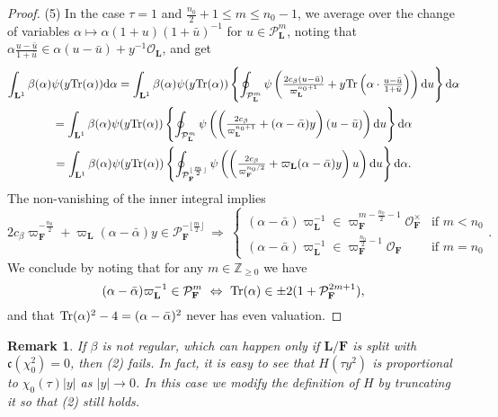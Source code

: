 \documentclass[A4]{amsart}
\def\leq{\leqslant}
\def\geq{\geqslant}
\newtheorem{remark} [theorem] {Remark}
\numberwithin{equation}{section} \everymath{\displaystyle}
\newcommand{\Tr}{{\rm Tr}}
\newcommand{\Z}{\mathbb{Z}}
\newcommand{\ud}{\mathrm{d}}
\newcommand{\F}{\mathbf{F}}
\newcommand{\bL}{\mathbf{L}}
\newcommand{\vO}{\mathcal{O}}
\newcommand{\vP}{\mathcal{P}}
\newcommand{\norm}[1][\cdot]{\lvert #1 \rvert}
\newcommand{\cond}{\mathfrak{c}}
\begin{document}
\begin{proof}
\noindent (5) In the case $\tau = 1$ and $\tfrac{n_0}{2}+1 \leq m \leq n_0-1$, we average over the change of variables $\alpha \mapsto \alpha (1+u)(1+\bar{u})^{-1}$ for $u \in \vP_{\bL}^m$, noting that $\alpha \tfrac{u-\bar{u}}{1+\bar{u}} \in \alpha(u-\bar{u})+y^{-1}\vO_{\bL}$, and get
\begin{multline*}
	\int_{\bL^1} \beta(\alpha) \psi(y \Tr(\alpha)) \ud \alpha = \int_{\bL^1} \beta(\alpha) \psi(y \Tr(\alpha)) \left\{ \oint_{\vP_{\bL}^m} \psi \left( \tfrac{2 c_{\beta} (u-\bar{u})}{\varpi_{\bL}^{n_0+1}} + y \Tr \left( \alpha \cdot \tfrac{u-\bar{u}}{1+\bar{u}} \right) \right) \ud u \right\} \ud \alpha \\
	= \int_{\bL^1} \beta(\alpha) \psi(y \Tr(\alpha)) \left\{ \oint_{\vP_{\bL}^m} \psi \left( \left( \tfrac{2c_{\beta}}{\varpi_{\bL}^{n_0+1}} + (\alpha - \bar{\alpha}) y \right) (u-\bar{u}) \right) \ud u \right\} \ud \alpha \\
	= \int_{\bL^1} \beta(\alpha) \psi(y \Tr(\alpha)) \left\{ \oint_{\vP_{\F}^{\lfloor \frac{m}{2} \rfloor}} \psi \left( \left( \tfrac{2c_{\beta}}{\varpi_{\F}^{n_0/2}} + \varpi_{\bL} (\alpha - \bar{\alpha}) y \right) u \right) \ud u \right\} \ud \alpha.
\end{multline*}
	The non-vanishing of the inner integral implies
	$$ 2c_{\beta} \varpi_{\F}^{-\frac{n_0}{2}} + \varpi_{\bL} (\alpha - \bar{\alpha}) y \in \vP_{\F}^{-\lfloor \frac{m}{2} \rfloor} \ \Rightarrow \ 
	\begin{cases}
	(\alpha - \bar{\alpha}) \varpi_{\bL}^{-1} \in \varpi_{\F}^{m-\frac{n_0}{2}-1} \vO_{\F}^{\times} & \text{if } m < n_0 \\
	(\alpha - \bar{\alpha}) \varpi_{\bL}^{-1} \in \varpi_{\F}^{\frac{n_0}{2}-1} \vO_{\F} & \text{if } m = n_0
	\end{cases}. $$
	We conclude by noting that for any $m \in \Z_{\geq 0}$ we have
	$$ (\alpha - \bar{\alpha}) \varpi_{\bL}^{-1} \in \vP_{\F}^m \ \Leftrightarrow \ \Tr(\alpha) \in \pm2(1+\vP_{\F}^{2m+1}), $$
and that $\Tr(\alpha)^2-4 = (\alpha-\bar{\alpha})^2$ never has even valuation.	
\end{proof}

\begin{remark} \label{rmk: TestFROI}
	If $\beta$ is not regular, which can happen only if $\bL/\F$ is split with $\cond(\chi_0^2)=0$, then (2) fails. In fact, it is easy to see that $H(\tau y^2)$ is proportional to $\chi_0(\tau) \norm[y]$ as $\norm[y] \to 0$. In this case we modify the definition of $H$ by \emph{truncating it} so that (2) still holds.
\end{remark}
\end{document}
